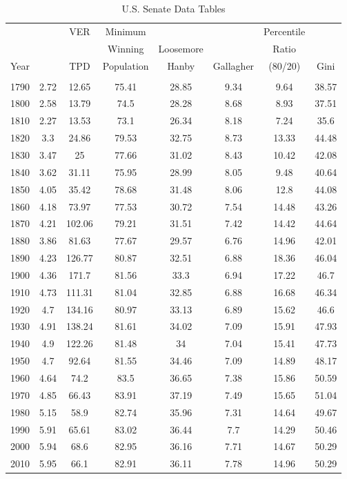  

\begin{table}[!htbp] \centering 
  \caption{U.S. Senate Data Tables} 
  \label{tab:app_sen} 
\begin{tabular}{c|ccccccc}
 &  & VER & Minimum &  &  & Percentile &  \\ 
  &   &   & Winning & Loosemore &  & Ratio &  \\ 
 Year &  & TPD & Population & Hanby & Gallagher & (80/20) & Gini \\ 
\hline \\[-1.8ex] 
1790 & 2.72 & 12.65 & 75.41 & 28.85 & 9.34 & 9.64 & 38.57 \\
1800 & 2.58 & 13.79 & 74.5 & 28.28 & 8.68 & 8.93 & 37.51 \\
1810 & 2.27 & 13.53 & 73.1 & 26.34 & 8.18 & 7.24 & 35.6 \\
1820 & 3.3 & 24.86 & 79.53 & 32.75 & 8.73 & 13.33 & 44.48 \\
1830 & 3.47 & 25 & 77.66 & 31.02 & 8.43 & 10.42 & 42.08 \\
1840 & 3.62 & 31.11 & 75.95 & 28.99 & 8.05 & 9.48 & 40.64 \\
1850 & 4.05 & 35.42 & 78.68 & 31.48 & 8.06 & 12.8 & 44.08 \\
1860 & 4.18 & 73.97 & 77.53 & 30.72 & 7.54 & 14.48 & 43.26 \\
1870 & 4.21 & 102.06 & 79.21 & 31.51 & 7.42 & 14.42 & 44.64 \\
1880 & 3.86 & 81.63 & 77.67 & 29.57 & 6.76 & 14.96 & 42.01 \\
1890 & 4.23 & 126.77 & 80.87 & 32.51 & 6.88 & 18.36 & 46.04 \\
1900 & 4.36 & 171.7 & 81.56 & 33.3 & 6.94 & 17.22 & 46.7 \\
1910 & 4.73 & 111.31 & 81.04 & 32.85 & 6.88 & 16.68 & 46.34 \\
1920 & 4.7 & 134.16 & 80.97 & 33.13 & 6.89 & 15.62 & 46.6 \\
1930 & 4.91 & 138.24 & 81.61 & 34.02 & 7.09 & 15.91 & 47.93 \\
1940 & 4.9 & 122.26 & 81.48 & 34 & 7.04 & 15.41 & 47.73 \\
1950 & 4.7 & 92.64 & 81.55 & 34.46 & 7.09 & 14.89 & 48.17 \\
1960 & 4.64 & 74.2 & 83.5 & 36.65 & 7.38 & 15.86 & 50.59 \\
1970 & 4.85 & 66.43 & 83.91 & 37.19 & 7.49 & 15.65 & 51.04 \\
1980 & 5.15 & 58.9 & 82.74 & 35.96 & 7.31 & 14.64 & 49.67 \\
1990 & 5.91 & 65.61 & 83.02 & 36.44 & 7.7 & 14.29 & 50.46 \\
2000 & 5.94 & 68.6 & 82.95 & 36.16 & 7.71 & 14.67 & 50.29 \\
2010 & 5.95 & 66.1 & 82.91 & 36.11 & 7.78 & 14.96 & 50.29 \\
\end{tabular}
\tabnotes{}
\end{table}

 
